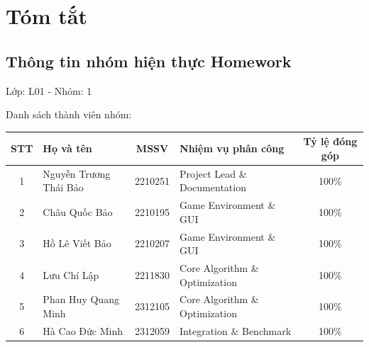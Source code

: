 \documentclass[12pt, a4paper]{report}
\theoremstyle{definition}
\begin{document}
% 


% 
%


% 

\chapter*{Tóm tắt}

\thispagestyle{empty}


\newpage
\section*{Thông tin nhóm hiện thực Homework}

Lớp: L01 - Nhóm: 1

Danh sách thành viên nhóm:

\begin{table}[H]
    \centering
    \renewcommand{\arraystretch}{1.6} 
    \begin{tabularx}{\textwidth}{|c|l|c|>{\RaggedRight\arraybackslash}X|c|}
        \hline
        \textbf{STT} & \textbf{Họ và tên} & \textbf{MSSV} & \textbf{Nhiệm vụ phân công} & \textbf{Tỷ lệ đóng góp} \\ \hline
        1 & Nguyễn Trương Thái Bảo & 2210251 & Project Lead \& Documentation & 100\% \\ \hline
        2 & Châu Quốc Bảo & 2210195 & Game Environment \& GUI & 100\% \\ \hline
        3 & Hồ Lê Viết Bảo & 2210207 & Game Environment \& GUI & 100\% \\ \hline
        4 & Lưu Chí Lập & 2211830 & Core Algorithm \& Optimization & 100\% \\ \hline
        5 & Phan Huy Quang Minh & 2312105 & Core Algorithm \& Optimization & 100\% \\ \hline
        6 & Hà Cao Đức Minh & 2312059 & Integration \& Benchmark & 100\% \\ \hline
    \end{tabularx}
\end{table}
\end{document}
